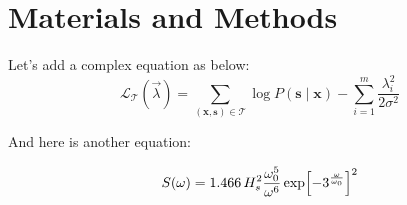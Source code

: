 \documentclass[12pt, oneside]{book}
\begin{document}
\chapter{Materials and Methods}

\lipsum*[3-9]

Let's add a complex equation as below:
\begin{equation}
\mathcal L_{\mathcal T}(\vec{\lambda})
= \sum_{(\mathbf{x},\mathbf{s})\in \mathcal T}
\log P(\mathbf{s}\mid\mathbf{x}) - \sum_{i=1}^m
\frac{\lambda_i^2}{2\sigma^2}
\end{equation}

\lipsum*[10-12]

And here is another equation:

\begin{equation}
S(\omega)=1.466\, H_s^2 \frac{\omega_0^5}{\omega^6} \exp\Bigl[-3^{\frac{\omega}{\omega_0}}\Bigr]^2
\end{equation}

\lipsum*[13-15]

\end{document}
